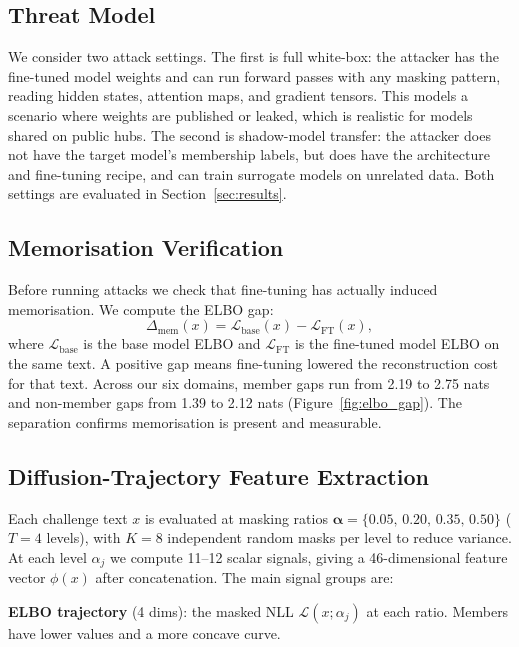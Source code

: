 \subsection{Threat Model}
\label{sec:threat}

We consider two attack settings.
The first is full white-box: the attacker has the fine-tuned model weights and
can run forward passes with any masking pattern, reading hidden states, attention
maps, and gradient tensors. This models a scenario where weights are published
or leaked, which is realistic for models shared on public hubs.
The second is shadow-model transfer: the attacker does not have the target model's
membership labels, but does have the architecture and fine-tuning recipe, and can
train surrogate models on unrelated data. Both settings are evaluated in
Section~\ref{sec:results}.

\subsection{Memorisation Verification}
\label{sec:verification}

Before running attacks we check that fine-tuning has actually induced memorisation.
We compute the ELBO gap:
\begin{equation}
  \Delta_{\mathrm{mem}}(x) = \mathcal{L}_{\mathrm{base}}(x) - \mathcal{L}_{\mathrm{FT}}(x),
\end{equation}
where $\mathcal{L}_{\mathrm{base}}$ is the base model ELBO and $\mathcal{L}_{\mathrm{FT}}$
is the fine-tuned model ELBO on the same text.
A positive gap means fine-tuning lowered the reconstruction cost for that text.
Across our six domains, member gaps run from 2.19 to 2.75 nats and
non-member gaps from 1.39 to 2.12 nats (Figure~\ref{fig:elbo_gap}).
The separation confirms memorisation is present and measurable.

\subsection{Diffusion-Trajectory Feature Extraction}
\label{sec:features}

Each challenge text $x$ is evaluated at masking ratios
$\boldsymbol{\alpha} = \{0.05,\,0.20,\,0.35,\,0.50\}$ ($T=4$ levels),
with $K=8$ independent random masks per level to reduce variance.
At each level $\alpha_j$ we compute 11--12 scalar signals, giving a
46-dimensional feature vector $\phi(x)$ after concatenation.
The main signal groups are:

\textbf{ELBO trajectory} (4 dims): the masked NLL $\mathcal{L}(x;\alpha_j)$ at each ratio.
Members have lower values and a more concave curve.

